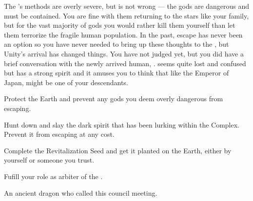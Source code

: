\documentclass[char]{guardians}
\begin{document}
The \cWarden{}'s methods are overly severe, but \cWarden{\they} is not wrong --- the gods are dangerous and must be contained. You are fine with them returning to the stars like your family, but for the vast majority of gods you would rather kill them yourself than let them terrorize the fragile human population. In the past, escape has never been an option so you have never needed to bring up these thoughts to the \cWarden{}, but Unity's arrival has changed things. You have not judged \cUnity{} yet, but you did have a brief conversation with the newly arrived human, \cKachiko{}. \cKachiko{\They} seems quite lost and confused but \cKachiko{\they} has a strong spirit and it amuses you to think that like the Emperor of Japan, \cKachiko{\they} might be one of your descendants.

\begin{itemz}[Goals]
  \item Protect the Earth and prevent any gods you deem overly dangerous from escaping.
	\item Hunt down and slay the dark spirit that has been lurking within the Complex. Prevent it from escaping at any cost.
	\item Complete the Revitalization Seed and get it planted on the Earth, either by yourself or someone you trust.
	\item Fufill your role as arbiter of the \pGames{}.
\end{itemz}


\begin{contacts}
  \contact{\cCaretaker{}} An ancient dragon who called this council meeting.
\end{contacts}
\end{document}
